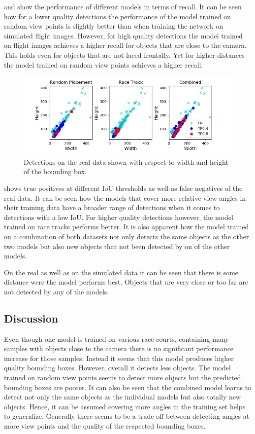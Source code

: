  and  show the performance of different models in terms of recall. It can be seen how for a lower quality detections the performance of the model trained on random view points is slightly better than when training the network on simulated flight images. However, for high quality detections the model trained on flight images achieves a higher recall for objects that are close to the camera. This holds even for objects that are not faced frontally. Yet for higher distances the model trained on random view points achieves a higher recall. 

\begin{figure}[htbp]
	\centering
	\includegraphics[width=\textwidth]{fig/view_scatter}
	\caption{Detections on the real data shown with respect to width and height of the bounding box.}
	\label{fig:view_scatter}
\end{figure}

 shows true positives at different \ac{IoU} thresholds as well as false negatives of the real data. It can be seen how the models that cover more relative view angles in their training data have a broader range of detections when it comes to detections with a low \ac{IoU}. For higher quality detections however, the model trained on race tracks performs better. It is also apparent how the model trained on a combination of both datasets not only detects the same objects as the other two models but also new objects that not been detected by on of the other models.

On the real as well as on the simulated data it can be seen that there is some distance were the model performs best. Objects that are very close or too far are not detected by any of the models.

\subsection{Discussion}

Even though one model is trained on various race courts, containing many samples with objects close to the camera there is no significant performance increase for those samples. Instead it seems that this model produces higher quality bounding boxes. However, overall it detects less objects. The model trained on random view points seems to detect more objects but the predicted bounding boxes are poorer. It can also be seen that the combined model learns to detect not only the same objects as the individual models but also totally new objects. Hence, it can be assumed covering more angles in the training set helps to generalize. Generally there seems to be a trade-off between detecting angles at more view points and the quality of the respected bounding boxes.

